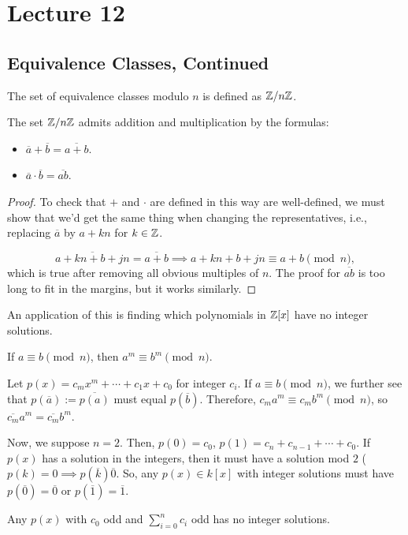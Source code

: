 \documentclass{article}
\begin{document}
\section{Lecture 12} 
\subsection{Equivalence Classes, Continued}
The set of equivalence classes modulo $n$ is defined as $\mathbb Z / n\mathbb Z$. 

\begin{lemma}
	The set $\mathbb Z /n\mathbb Z$ admits addition and multiplication by the formulas:
	\begin{itemize}
		\item $\overline{a} + \overline{b} = \overline{a + b}$.
		\item $\overline{a} \cdot \overline{b} = \overline{ab}$.
	\end{itemize}
\end{lemma}

\begin{proof}
	To check that $+$ and $\cdot$ are defined in this way are well-defined, we must show that we'd get the same thing when changing the representatives, i.e., replacing $\overline a$ by $a + kn$ for $k \in \mathbb Z$. 

	\[\overline{a + kn + b + jn} = \overline{a + b} \implies a + kn + b + jn \equiv a + b \pmod n,\] which is true after removing all obvious multiples of $n$. The proof for $\overline{ab}$ is too long to fit in the margins, but it works similarly.
\end{proof}

An application of this is finding which polynomials in $\mathbb Z[x]$ have no integer solutions. 


\begin{remark}
	If $a \equiv b \pmod n$, then $a^m \equiv b^m \pmod n$.

	Let $p(x) = c_mx^m + \cdots + c_1x + c_0$ for integer $c_i$. If $a \equiv b \pmod n$, we further see that $p(\overline a) := \overline{p(a)}$ must equal $p(\overline b)$. Therefore, $c_ma^m \equiv c_mb^m \pmod n$, so $\overline{c_m}a^m = \overline{c_m}b^m$.
\end{remark}

Now, we suppose $n = 2$. Then, $p(0) = c_0$, $p(1) = c_n + c_{n-1} + \cdots + c_0$. If $p(x)$ has a solution in the integers, then it must have a solution mod $2$ ($p(k) = 0\implies p(\overline k)  \overline 0$. So, any $p(x) \in k[x]$ with integer solutions must have $p(\overline 0) = \overline 0$ or $p(\overline 1) = \overline 1$. 
\begin{proposition}
	Any $p(x)$ with $c_0$ odd and $\sum_{i = 0}^n c_i$ odd has no integer solutions. 
\end{proposition}
\end{document}
